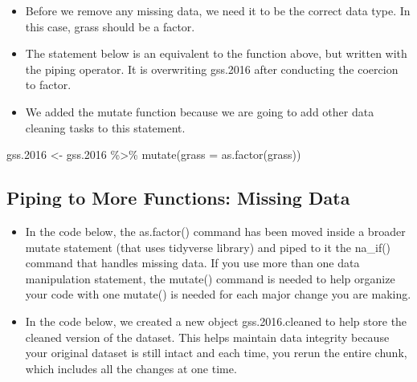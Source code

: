 \documentclass[
  letterpaper,
  DIV=11,
  numbers=noendperiod]{scrreprt}
\newenvironment{Shaded}{\begin{snugshade}}{\end{snugshade}}
\newcommand{\AttributeTok}[1]{\textcolor[rgb]{0.40,0.45,0.13}{#1}}
\newcommand{\CommentTok}[1]{\textcolor[rgb]{0.37,0.37,0.37}{#1}}
\newcommand{\FloatTok}[1]{\textcolor[rgb]{0.68,0.00,0.00}{#1}}
\newcommand{\FunctionTok}[1]{\textcolor[rgb]{0.28,0.35,0.67}{#1}}
\newcommand{\NormalTok}[1]{\textcolor[rgb]{0.00,0.23,0.31}{#1}}
\newcommand{\OtherTok}[1]{\textcolor[rgb]{0.00,0.23,0.31}{#1}}
\newcommand{\SpecialCharTok}[1]{\textcolor[rgb]{0.37,0.37,0.37}{#1}}
\providecommand{\tightlist}{%
  \setlength{\itemsep}{0pt}\setlength{\parskip}{0pt}}\usepackage{longtable,booktabs,array}
\begin{document}
\begin{itemize}
\tightlist
\item
  Before we remove any missing data, we need it to be the correct data
  type. In this case, grass should be a factor.
\end{itemize}

\begin{Shaded}
\end{Shaded}

\begin{itemize}
\tightlist
\item
  The statement below is an equivalent to the function above, but
  written with the piping operator. It is overwriting gss.2016 after
  conducting the coercion to factor.
\item
  We added the mutate function because we are going to add other data
  cleaning tasks to this statement.
\end{itemize}

\begin{Shaded}
\begin{Highlighting}[]
\NormalTok{gss}\FloatTok{.2016} \OtherTok{\textless{}{-}}\NormalTok{ gss}\FloatTok{.2016} \SpecialCharTok{\%\textgreater{}\%}
    \FunctionTok{mutate}\NormalTok{(}\AttributeTok{grass =} \FunctionTok{as.factor}\NormalTok{(grass))}
\end{Highlighting}
\end{Shaded}

\subsection{Piping to More Functions: Missing
Data}\label{piping-to-more-functions-missing-data}

\begin{itemize}
\tightlist
\item
  In the code below, the as.factor() command has been moved inside a
  broader mutate statement (that uses tidyverse library) and piped to it
  the na\_if() command that handles missing data. If you use more than
  one data manipulation statement, the mutate() command is needed to
  help organize your code with one mutate() is needed for each major
  change you are making.
\item
  In the code below, we created a new object gss.2016.cleaned to help
  store the cleaned version of the dataset. This helps maintain data
  integrity because your original dataset is still intact and each time,
  you rerun the entire chunk, which includes all the changes at one
  time.
\end{itemize}
\end{document}
